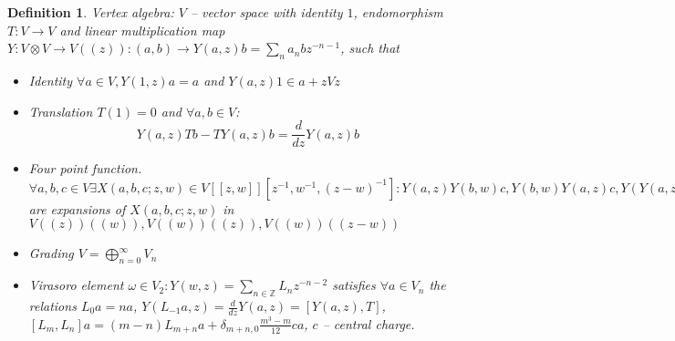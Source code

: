 \documentclass[12pt]{article}
\newtheorem{Def}{Definition}[section]
\begin{document}
\begin{Def}
  Vertex algebra: $V$ -- vector space with identity $1$, endomorphism
  $T:V\to V$ and linear multiplication map $Y:V\otimes V\to V((z)):
  (a,b)\to Y(a,z)b=\sum_n a_n b z^{-n-1}$,
  such that
  \begin{itemize}
  \item {\it Identity} $\forall a\in V, Y(1,z) a =a$ and $Y(a,z) 1 \in a+z V z$
  \item {\it Translation} $T(1)=0$ and $\forall a,b\in V$:
    $$Y(a,z)T b - T Y(a,z) b =
    \frac{d}{dz} Y(a,z) b$$
  \item {\it Four point function}. $\forall a,b,c\in V \exists
    X(a,b,c;z,w)\in V[[z,w]][z^{-1},w^{-1},(z-w)^{-1}]: Y(a,z)Y(b,w)c,
    Y(b,w)Y(a,z)c, Y(Y(a,z-w)b,w)c$ are expansions of $X(a,b,c;z,w)$
    in $V((z))((w)), V((w))((z)), V((w))((z-w))$
  \item {\it Grading} $V=\bigoplus_{n=0}^{\infty} V_n$
  \item {\it Virasoro element} $\omega\in V_2: Y(w,z)=\sum_{n\in
      \mathbb{Z}} L_n z^{-n-2}$ satisfies $\forall a\in V_n$ the
      relations $L_0 a =n a$,
      $Y(L_{-1}a,z)=\frac{d}{dz}Y(a,z)=[Y(a,z),T]$,
      $[L_m,L_n]a=(m-n)L_{m+n} a + \delta_{m+n,0} \frac{m^3 -
        m}{12}ca$, $c$ -- central charge.
  \end{itemize}

\end{Def}

{}

\end{document}
